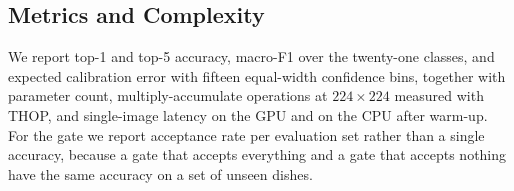 \subsection{Metrics and Complexity}
We report top-1 and top-5 accuracy, macro-F1 over the twenty-one classes, and
expected calibration error with fifteen equal-width confidence bins, together
with parameter count, multiply-accumulate operations at $224\times224$ measured
with THOP, and single-image latency on the GPU and on the CPU after warm-up. For
the gate we report acceptance rate per evaluation set rather than a single
accuracy, because a gate that accepts everything and a gate that accepts nothing
have the same accuracy on a set of unseen dishes.
